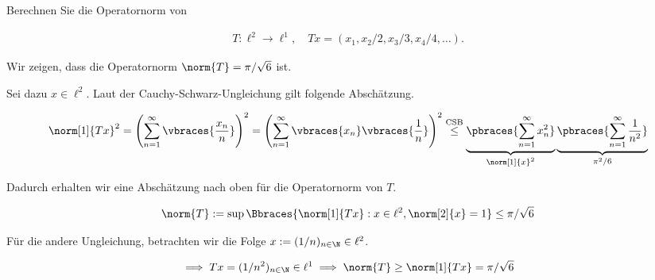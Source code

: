 
\begin{exercise}

Berechnen Sie die Operatornorm von

\begin{align*}
    T: \ell^2 \to \ell^1,
    \quad
    Tx = (x_1, x_2 / 2, x_3 / 3, x_4 / 4, \ldots).
\end{align*}

\end{exercise}


\begin{solution}

Wir zeigen, dass die Operatornorm $\norm{T} = \pi / \sqrt{6}$ ist.

Sei dazu $x \in \ell^2$.
Laut der Cauchy-Schwarz-Ungleichung gilt folgende Abschätzung.

\begin{align*}
    \norm[1]{Tx}^2
    =
    \left(\sum_{n=1}^\infty
    \vbraces
    {
        \frac{x_n}{n}
    }\right)^2
    =
    \left(\sum_{n=1}^\infty
    \vbraces{x_n}
    \vbraces
    {
        \frac{1}{n}
    }\right)^2
    \stackrel{\text{CSB}}{\leq}
    \underbrace
    {
        \pbraces
        {
            \sum_{n=1}^\infty
            x_n^2
        }
    }_{
        \norm[1]{x}^2
    }
    \underbrace
    {
        \pbraces
        {
            \sum_{n=1}^\infty
            \frac{1}{n^2}
        }
    }_{
        \pi^2 / 6
    }
\end{align*}

Dadurch erhalten wir eine Abschätzung nach oben für die Operatornorm von $T$.

\begin{align*}
    \norm{T}
    :=
    \sup
    \Bbraces
    {
        \norm[1]{Tx}:
        x \in \ell^2,
        \norm[2]{x} = 1
    }
    \leq
    \pi / \sqrt{6}
\end{align*}

Für die andere Ungleichung, betrachten wir die Folge $x := (1/n)_{n \in \N} \in \ell^2$.

\begin{align*}
    \implies
    Tx = (1/n^2)_{n \in \N} \in \ell^1
    \implies
    \norm{T} \geq \norm[1]{Tx} = \pi / \sqrt{6}
\end{align*}

\end{solution}

